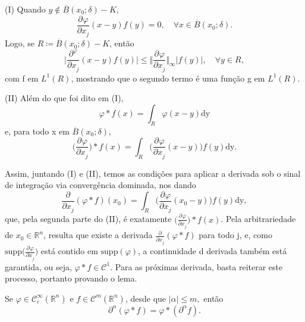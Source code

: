 \documentclass[../distribution_theory_notes.tex]{subfiles}
\begin{document}
\begin{proof*}
	(I) Quando \(y\not\in \overline{B}(x_{0}; \delta  )-K\),
	\[
		\frac{\partial^{}\varphi }{\partial x_{j}^{}}(x-y)f(y)=0,\quad \forall x\in \overline{B}(x_{0}; \delta ).
	\]
	Logo, se \(R\coloneqq \overline{B}(x_{0}; \delta )-K\), então
	\[
		\biggl\vert \frac{\partial^{\varphi }}{\partial x_{j}^{}}(x-y)f(y) \biggr\vert \leq \biggl\Vert \frac{\partial^{}\varphi }{\partial x_{j}^{}} \biggr\Vert_{\infty}|f(y)|,\quad \forall y\in R,
	\]
	com f em \(L^{1}(R)\), mostrando que o segundo termo é uma função g em \(L^{1}(R)\).

	(II) Além do que foi dito em (I),
	\[
		\varphi *f(x)=\int_{R}^{}\varphi (x-y) \mathrm{dy}
	\]
	e, para todo x em \(\overline{B}(x_{0}; \delta )\),
	\[
		\biggl(\frac{\partial^{}\varphi }{\partial x_{j}^{}}\biggr)* f(x) = \int_{R}^{}\biggl(\frac{\partial^{}\varphi }{\partial x_{j}^{}}(x-y)\biggr)f(y) \mathrm{dy}.
	\]

	Assim, juntando (I) e (II), temos as condições para aplicar a derivada sob o sinal de integração via convergência dominada, nos dando
	\[
		\frac{\partial^{}}{\partial x_{j}^{}}(\varphi *f)(x_{0})=\int_{R}^{}\biggl(\frac{\partial^{}\varphi }{\partial x_{j}^{}}(x_{0}-y)\biggr)f(y) \mathrm{dy},
	\]
	que, pela segunda parte do (II), é exatamente \(\biggl(\frac{\partial^{}\varphi }{\partial x_{j}^{}}\biggr)* f(x)\). Pela arbitrariedade de \(x_{0}\in \mathbb{R}^{n}\), resulta que existe a derivada \(\frac{\partial^{}}{\partial x_{j}^{}}(\varphi *f)\) para todo j, e, como \(\mathrm{supp}\biggl(\frac{\partial^{}\varphi }{\partial x_{j}^{}}\biggr)\) está contido em \(\mathrm{supp}(\varphi )\), a continuidade d derivada também está garantida, ou seja, \(\varphi *f\in \mathcal{C}^{1}\). Para as próximas derivada, basta reiterar este processo, portanto provando o lema. \qedsymbol

\end{proof*}
\begin{tcolorbox}[
		skin=enhanced,
		title=Observação,
		fonttitle=\bfseries,
		colframe=black,
		colbacktitle=cyan!75!white,
		colback=cyan!15,
		colbacklower=black,
		coltitle=black,
		drop fuzzy shadow,
	]
	Se \(\varphi \in \mathcal{C}_{c}^{\infty}(\mathbb{R}^{n})\) e \(f\in \mathcal{C}^{m}(\mathbb{R}^{n})\), desde que \(|\alpha |\leq m,\) então
	\[
		\partial^{\alpha }(\varphi*f)=\varphi *(\partial^{\alpha }f).
	\]
\end{tcolorbox}
\end{document}
